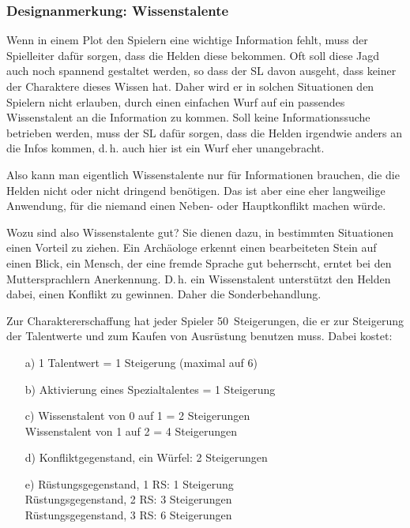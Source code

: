 \begin{design}
\subsubsection{Designanmerkung: Wissenstalente}

Wenn in einem Plot den Spielern eine wichtige Information fehlt, muss der Spielleiter dafür sorgen, dass die Helden diese bekommen. Oft soll diese Jagd auch noch spannend gestaltet werden, so dass der SL davon ausgeht, dass keiner der Charaktere dieses Wissen hat. Daher wird er in solchen Situationen den Spielern nicht erlauben, durch einen einfachen Wurf auf ein passendes Wissenstalent an die Information zu kommen. Soll keine Informationssuche betrieben werden, muss der SL dafür sorgen, dass die Helden irgendwie anders an die Infos kommen, d.\,h. auch hier ist ein Wurf eher unangebracht.

Also kann man eigentlich Wissenstalente nur für Informationen brauchen, die die Helden nicht oder nicht dringend benötigen. Das ist aber eine eher langweilige Anwendung, für die niemand einen Neben- oder Hauptkonflikt machen würde.

Wozu sind also Wissenstalente gut? Sie dienen dazu, in bestimmten Situationen einen Vorteil zu ziehen. Ein Archäologe erkennt einen bearbeiteten Stein auf einen Blick, ein Mensch, der eine fremde Sprache gut beherrscht, erntet bei den Muttersprachlern Anerkennung. D.\,h. ein Wissenstalent unterstützt den Helden dabei, einen Konflikt zu gewinnen. Daher die Sonderbehandlung.
\end{design}
\medskip


Zur Charaktererschaffung hat jeder Spieler 50~Steigerungen, die er zur Steigerung der Talentwerte und zum Kaufen von Ausrüstung benutzen muss. Dabei kostet:
\begin{enumerate}
  \item[a)] 1 Talentwert = 1 Steigerung (maximal auf 6)
  \item[b)] Aktivierung eines Spezialtalentes = 1 Steigerung
  \item[c)] Wissenstalent von 0 auf 1 = 2 Steigerungen \\
  Wissenstalent von 1 auf 2 = 4 Steigerungen
  \item[d)] Konfliktgegenstand, ein Würfel: 2 Steigerungen 
  \item[e)] Rüstungsgegenstand, 1 RS: 1 Steigerung \\
                Rüstungsgegenstand, 2 RS: 3 Steigerungen \\
                Rüstungsgegenstand, 3 RS: 6 Steigerungen 
\end{enumerate}

